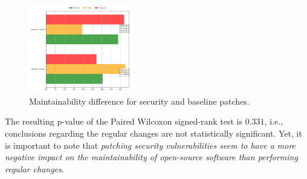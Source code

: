 \documentclass[10pt,conference]{IEEEtran}
\begin{document}
\begin{figure}[h]	
 	\centering 	\includegraphics[width=0.4\textwidth]{figures/main_comparison.pdf}
 	\caption{Maintainability difference for security and baseline patches.}
	\label{fig:secvsreg}
\end{figure}

The resulting p-value of the Paired Wilcoxon signed-rank test is $0.331$, i.e., 
conclusions regarding the regular changes are not statistically significant. 
Yet, it is important to note that \emph{patching security vulnerabilities seem 
to have a more negative impact on the maintainability of open-source software 
than performing regular changes}.
\end{document}
